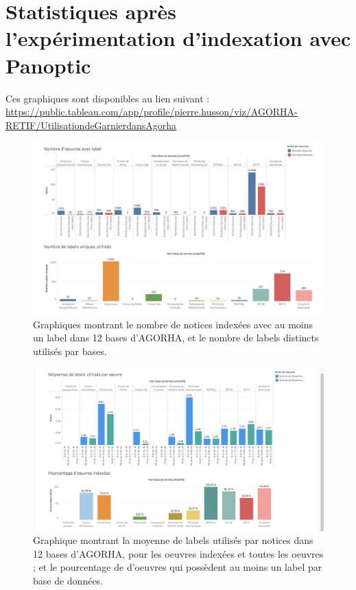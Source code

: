 \section[Statistiques d'indexation]{Statistiques après l'expérimentation d'indexation avec Panoptic}

Ces graphiques sont disponibles au lien suivant : \url{https://public.tableau.com/app/profile/pierre.husson/viz/AGORHA-RETIF/UtilisationdeGarnierdansAgorha}

\begin{figure}[H]
    \centering
    \includegraphics[height=0.4\textheight]{annexes/stats/graphiqueGarnier2A.png}
    \caption{Graphiques montrant le nombre de notices indexées avec au moins un label dans 12 bases d'AGORHA, et le nombre de labels distincts utilisés par bases.}
    \label{stat:Garnier2A}
\end{figure}

\begin{figure}[H]
    \centering
    \includegraphics[height=0.4\textheight]{annexes/stats/graphiqueGarnier2B.png}
    \caption{Graphique montrant la moyenne de labels utilisés par notices dans 12 bases d'AGORHA, pour les oeuvres indexées et toutes les oeuvres ; et le pourcentage de d'oeuvres qui possèdent au moins un label par base de données.}
    \label{stat:Garnier2B}
\end{figure}